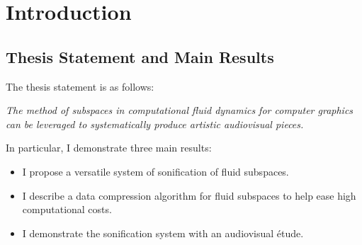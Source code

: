 \chapter{Introduction}

\section{Thesis Statement and Main Results}
The thesis statement is as follows:

\begin{addmargin}[1em]{2em}
{\em The method of subspaces in computational fluid dynamics for computer graphics can be leveraged to systematically produce artistic audiovisual pieces.}
\end{addmargin}
In particular, I demonstrate three main results:

\begin{itemize}
	\item I propose a versatile system of sonification of fluid subspaces.
	\item I describe a data compression algorithm for fluid subspaces to help ease high computational costs.
	\item I demonstrate the sonification system with an audiovisual {\'e}tude.
\end{itemize} 